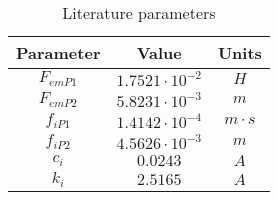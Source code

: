 \begin{table}[H]

    \centering
    \begin{tabular}{|c|c|c|}
        \hline
        \textbf{Parameter} & \textbf{Value}         & \textbf{Units} \\
        \hline
        $F_{emP1}$         & $1.7521 \cdot 10^{-2}$ & $H$            \\
        $F_{emP2}$         & $5.8231 \cdot 10^{-3}$ & $m$            \\
        $f_{iP1}$          & $1.4142 \cdot 10^{-4}$ & $m \cdot s$    \\
        $f_{iP2}$          & $4.5626 \cdot 10^{-3}$ & $m$            \\
        $c_i$              & $0.0243$               & $A$            \\
        $k_i$              & $2.5165$               & $A$            \\
        \hline
    \end{tabular}

    \caption{Literature parameters}
    \label{tab:literature_parameters}

\end{table}